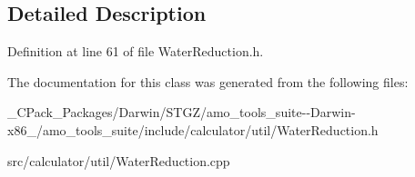 \subsection{Detailed Description}


Definition at line 61 of file Water\+Reduction.\+h.



The documentation for this class was generated from the following files\+:\begin{DoxyCompactItemize}
\item 
\+\_\+\+C\+Pack\+\_\+\+Packages/\+Darwin/\+S\+T\+G\+Z/amo\+\_\+tools\+\_\+suite-\/-\/\+Darwin-\/x86\+\_/amo\+\_\+tools\+\_\+suite/include/calculator/util/Water\+Reduction.\+h\item 
src/calculator/util/Water\+Reduction.\+cpp\end{DoxyCompactItemize}
